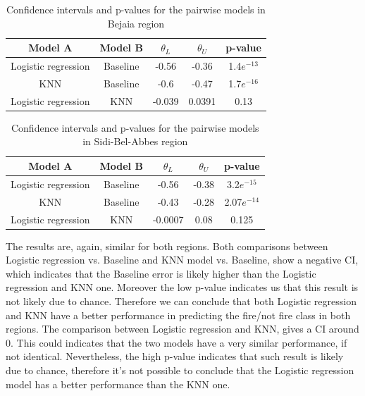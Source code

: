 \documentclass[10pt]{article}
\numberwithin{equation}{section}
\numberwithin{figure}{section}
\numberwithin{table}{section}
\begin{document}
\begin{table}[H]
\centering
\begin{tabular}{|c|c|c|c|c|} \hline
\textbf{Model A}  & \textbf{Model B}  & \textbf{$\theta_L$} & \textbf{$\theta_U$} & \textbf{p-value} \\ \hline
Logistic regression & Baseline          & -0.56               & -0.36            & 1.4$e^{-13}$     \\ \hline
KNN               & Baseline          & -0.6               & -0.47             & 1.7$e^{-16}$     \\ \hline
Logistic regression   & KNN & -0.039            & 0.0391           & 0.13    \\ \hline
\end{tabular}
\caption{Confidence intervals and p-values for the pairwise models in Bejaia region}
\end{table}


\begin{table}[H]
\centering
\begin{tabular}{|c|c|c|c|c|} \hline
\textbf{Model A}  & \textbf{Model B}  & \textbf{$\theta_L$} & \textbf{$\theta_U$} & \textbf{p-value} \\ \hline
Logistic regression & Baseline          & -0.56               & -0.38               & 3.2$e^{-15}$     \\ \hline
KNN               & Baseline          & -0.43               & -0.28              & 2.07$e^{-14}$     \\ \hline
Logistic regression  & KNN & -0.0007            & 0.08           & 0.125    \\ \hline
\end{tabular}
\caption{Confidence intervals and p-values for the pairwise models in Sidi-Bel-Abbes region}
\end{table}

The results are, again, similar for both regions.
Both comparisons between Logistic regression vs. Baseline and KNN model vs. Baseline, show a negative CI, which indicates that the Baseline error is likely higher than the Logistic regression and KNN one. Moreover the low p-value indicates us that this result is not likely due to chance.
Therefore we can conclude that both Logistic regression and KNN have a better performance in predicting the fire/not fire class in both regions.
The comparison between Logistic regression and KNN, gives a CI around 0.
This could indicates that the two models have a very similar performance, if not identical. Nevertheless, the high p-value indicates that such result is likely due to chance, therefore it's not possible to conclude that the Logistic regression model has a better performance than the KNN one.
\end{document}
